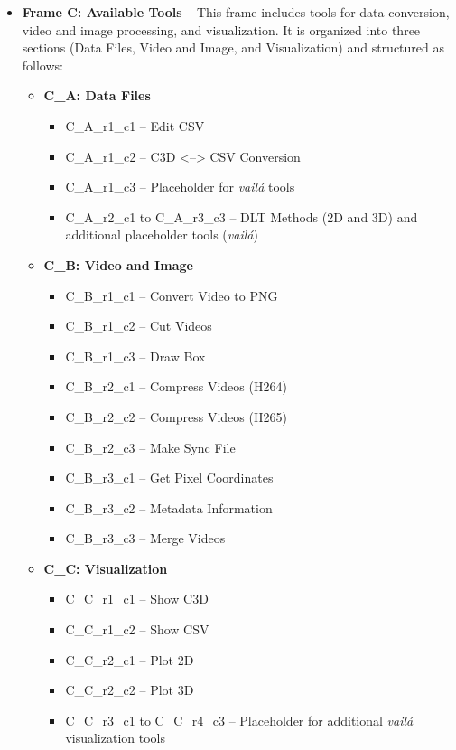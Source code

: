 \documentclass{article}
\begin{document}
\begin{itemize}
    \item \textbf{Frame C: Available Tools} – This frame includes tools for data conversion, video and image processing, and visualization. It is organized into three sections (Data Files, Video and Image, and Visualization) and structured as follows:
    \begin{itemize}
        \item \textbf{C\_A: Data Files}
        \begin{itemize}
            \item C\_A\_r1\_c1 – Edit CSV
            \item C\_A\_r1\_c2 – C3D <--> CSV Conversion
            \item C\_A\_r1\_c3 – Placeholder for \textit{vailá} tools
            \item C\_A\_r2\_c1 to C\_A\_r3\_c3 – DLT Methods (2D and 3D) and additional placeholder tools (\textit{vailá})
        \end{itemize}
        \item \textbf{C\_B: Video and Image}
        \begin{itemize}
            \item C\_B\_r1\_c1 – Convert Video to PNG
            \item C\_B\_r1\_c2 – Cut Videos
            \item C\_B\_r1\_c3 – Draw Box
            \item C\_B\_r2\_c1 – Compress Videos (H264)
            \item C\_B\_r2\_c2 – Compress Videos (H265)
            \item C\_B\_r2\_c3 – Make Sync File
            \item C\_B\_r3\_c1 – Get Pixel Coordinates
            \item C\_B\_r3\_c2 – Metadata Information
            \item C\_B\_r3\_c3 – Merge Videos
        \end{itemize}
        \item \textbf{C\_C: Visualization}
        \begin{itemize}
            \item C\_C\_r1\_c1 – Show C3D
            \item C\_C\_r1\_c2 – Show CSV
            \item C\_C\_r2\_c1 – Plot 2D
            \item C\_C\_r2\_c2 – Plot 3D
            \item C\_C\_r3\_c1 to C\_C\_r4\_c3 – Placeholder for additional \textit{vailá} visualization tools
        \end{itemize}
    \end{itemize}
\end{itemize}
\end{document}
